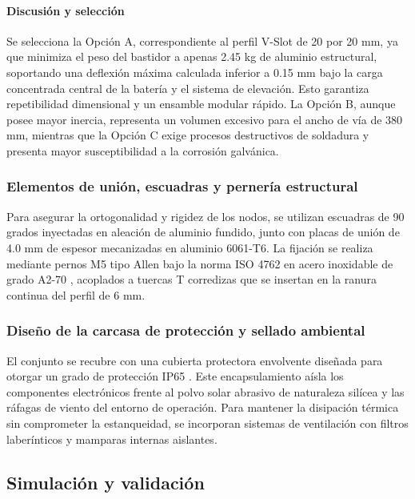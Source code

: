 \documentclass[../../General.tex]{subfiles}
\begin{document}
\paragraph{Discusión y selección}
Se selecciona la Opción A, correspondiente al perfil V-Slot de 20 por 20 mm, ya que minimiza el peso del bastidor a apenas 2.45 kg de aluminio estructural, soportando una deflexión máxima calculada inferior a 0.15 mm bajo la carga concentrada central de la batería y el sistema de elevación. Esto garantiza repetibilidad dimensional y un ensamble modular rápido. La Opción B, aunque posee mayor inercia, representa un volumen excesivo para el ancho de vía de 380 mm, mientras que la Opción C exige procesos destructivos de soldadura y presenta mayor susceptibilidad a la corrosión galvánica.

\subsubsection{Elementos de unión, escuadras y pernería estructural}
Para asegurar la ortogonalidad y rigidez de los nodos, se utilizan escuadras de 90 grados inyectadas en aleación de aluminio fundido, junto con placas de unión de 4.0 mm de espesor mecanizadas en aluminio 6061-T6. La fijación se realiza mediante pernos M5 tipo Allen bajo la norma ISO 4762 \citep{iso4762_2004} en acero inoxidable de grado A2-70 \citep{iso3506_1_2020}, acoplados a tuercas T corredizas que se insertan en la ranura continua del perfil de 6 mm.

\subsubsection{Diseño de la carcasa de protección y sellado ambiental}
El conjunto se recubre con una cubierta protectora envolvente diseñada para otorgar un grado de protección IP65 \citep{iec60529_2013}. Este encapsulamiento aísla los componentes electrónicos frente al polvo solar abrasivo de naturaleza silícea y las ráfagas de viento del entorno de operación. Para mantener la disipación térmica sin comprometer la estanqueidad, se incorporan sistemas de ventilación con filtros laberínticos y mamparas internas aislantes.

\subsection{Simulación y validación}
\end{document}
